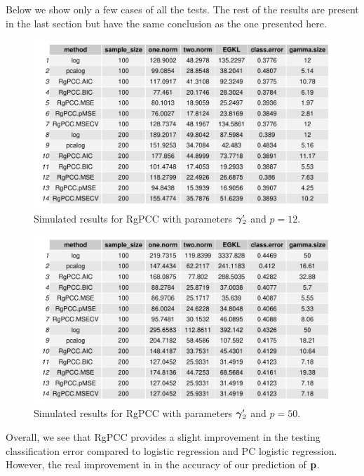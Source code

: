 \documentclass[main.tex]{subfiles}
\begin{document}
Below we show only a few cases of all the tests. The rest of the results are present in the last section but have the same conclusion as the one presented here.
\begin{figure}[H]
    \centering
    \includegraphics[width =  \textwidth]{simulated/(sparsity3-nonlead,12)_metrics.pdf}
    \caption{Simulated results for RgPCC with parameters $\boldsymbol \gamma_2'$ and $p = 12$.}
    \label{fig:simulated2-12}
\end{figure}

\begin{figure}[H]
	\centering
    \includegraphics[width =  \textwidth]{simulated/(sparsity3-nonlead,50)_metrics.pdf}
    \caption{Simulated results for RgPCC with parameters $\boldsymbol \gamma_2'$ and $p = 50$.}
    \label{fig:simulated2-50}
\end{figure}

Overall, we see that RgPCC provides a slight improvement in the testing classification error compared to logistic regression and PC logistic regression. However, the real improvement in in the accuracy of our prediction of $\mathbf{p}$.
\end{document}

